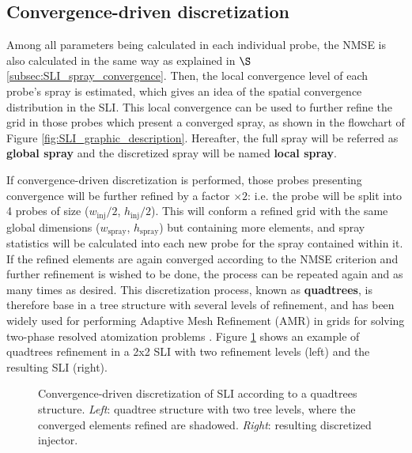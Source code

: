 \subsection{Convergence-driven discretization}
\label{subsec:SLI_quadtrees_discretization}

Among all parameters being calculated in each individual probe, the NMSE is also calculated in the same way as explained in $\S$\ref{subsec:SLI_spray_convergence}. Then, the local convergence level of each probe's spray is estimated, which gives an idea of the spatial convergence distribution in the SLI. This local convergence can be used to further refine the grid in those probes which present a converged spray, as shown in the flowchart of Figure \ref{fig:SLI_graphic_description}. Hereafter, the full spray will be referred as \textbf{global spray} and the discretized spray will be named \textbf{local spray}.

If convergence-driven discretization is performed, those probes presenting convergence will be further refined by a factor $\times 2$: i.e. the probe will be split into 4 probes of size ($w_\mathrm{inj}/2$, $h_\mathrm{inj}/2$). This will conform a refined grid with the same global dimensions ($w_\mathrm{spray}$, $h_\mathrm{spray}$) but containing more elements, and spray statistics will be calculated into each new probe for the spray contained within it. If the refined elements are again converged according to the NMSE criterion and further refinement is wished to be done, the process can be repeated again and as many times as desired. This discretization process, known as \textbf{quadtrees}, is therefore base in a tree structure with several levels of refinement, and has been widely used for performing Adaptive Mesh Refinement (AMR) in grids for solving two-phase resolved atomization problems . Figure \ref{fig:quadtrees_tree_structure} shows an example of quadtrees refinement in a 2x2 SLI with two refinement levels (left) and the resulting SLI (right).



\begin{figure}[h!]	
	\centering
	\caption[Convergence-driven discretization of SLI according to a quadtrees structure.]{Convergence-driven discretization of SLI according to a quadtrees structure. \textsl{Left}: quadtree structure with two tree levels, where the converged elements refined are shadowed. \textsl{Right}: resulting discretized injector. }
	\label{fig:quadtrees_tree_structure}
\end{figure}



